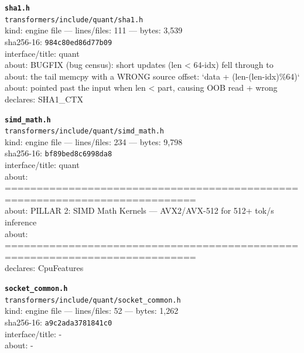 \noindent\textbf{\texttt{sha1.h}}\\
\texttt{transformers/include/quant/sha1.h}\\
kind: engine file --- lines/files: 111 --- bytes: 3,539\\
sha256-16: \texttt{984c80ed86d77b09}\\
interface/title: quant\\
about: BUGFIX (bug census): short updates (len < 64-idx) fell through to\\
about: the tail memcpy with a WRONG source offset: `data + (len-(len-idx)\%64)`\\
about: pointed past the input when len < part, causing OOB read + wrong\\
declares: SHA1\_CTX\\
\vspace*{6.0pt}

\noindent\textbf{\texttt{simd\_math.h}}\\
\texttt{transformers/include/quant/simd\_math.h}\\
kind: engine file --- lines/files: 234 --- bytes: 9,798\\
sha256-16: \texttt{bf89bed8c6998da8}\\
interface/title: quant\\
about: ============================================================================\\
about: PILLAR 2: SIMD Math Kernels — AVX2/AVX-512 for 512+ tok/s inference\\
about: ============================================================================\\
declares: CpuFeatures\\
\vspace*{6.0pt}

\noindent\textbf{\texttt{socket\_common.h}}\\
\texttt{transformers/include/quant/socket\_common.h}\\
kind: engine file --- lines/files: 52 --- bytes: 1,262\\
sha256-16: \texttt{a9c2ada3781841c0}\\
interface/title: -\\
about: -\\
\vspace*{6.0pt}
\newpage

